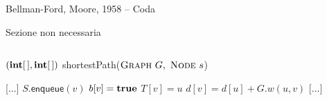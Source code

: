 \begin{frame}{Bellman-Ford, Moore, 1958 -- Coda}

\vspace{-9pt}
\begin{myboxtitle}
\BI
\item Sezione non necessaria
\EI
\end{myboxtitle}

\vspace{-18pt}
\begin{columns}
\small
\begin{Procedure}
\caption[A]{$(\INTARRAY, \INTARRAY)$ \textsf{shortestPath}($\textsc{Graph}\ G,\ \textsc{Node}\ s$)}
[...]\;
    {
      {
        $S.\textsf{enqueue}(v)$\;
        $b[v] = \TRUE$\;
      }
      $T[v] = u$\;
      $d[v] = d[u] + G.w(u,v)$\;
    }
[...]\;
\end{Procedure}
\end{columns}

\end{frame}



